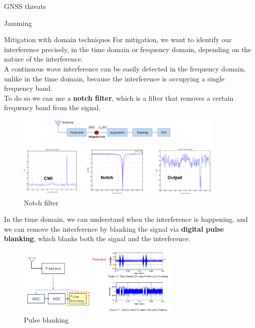 \begin{section}{GNSS threats}
\begin{subsection}{Jamming}
      \begin{subsubsection}{Mitigation with domain techniques}
        For mitigation, we want to identify our interference precisely, in the time domain
        or frequency domain, depending on the nature of the interference.\\
        A continuous wave interference can be easily detected in the frequency domain, unlike in the 
        time domain, because the interference is occupying a single frequency band.\\

        To do so we can use a \textbf{notch filter}, which is a filter that removes a certain
        frequency band from the signal.\\

        \begin{figure}[h]
          \centering
          \includegraphics[width=0.9\textwidth]{img/wireless/notch filter.png}
          \caption{Notch filter}
          \label{fig:GNSS notch filter}
        \end{figure}

        In the time domain, we can understand when the interference is happening, and we can
        remove the interference by blanking the signal via \textbf{digital pulse blanking}, which 
        blanks both the signal and the interference.\\

        \begin{figure}[h]
          \centering
          \includegraphics[width=0.7\textwidth]{img/wireless/digital pulse blanking.png}
          \caption{Pulse blanking}
          \label{fig:GNSS pulse blanking}
        \end{figure}
      \end{subsubsection}
    \end{subsection}


\end{section}
